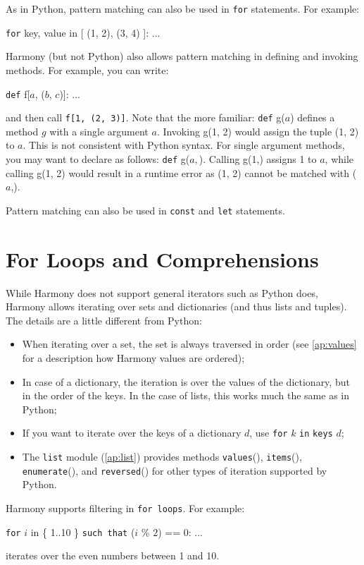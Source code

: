 \documentclass{report}
\newenvironment{code}{
\tcolorbox
}{
\endtcolorbox
}
\begin{document}
As in Python, pattern matching can also be used in \texttt{for} statements.
For example:
\begin{code}
\texttt{for} key, value in [ (1, 2), (3, 4) ]:
    ...
\end{code}

Harmony (but not Python)
also allows pattern matching in defining and invoking methods.
For example, you can write:
\begin{code}
\texttt{def} f[$a$, ($b$, $c$)]: ...
\end{code}
and then call \texttt{f[1, (2, 3)]}.
Note that the more familiar: \texttt{def} g($a$) defines a method $g$ with
a single argument $a$.  Invoking g(1, 2) would assign the tuple (1, 2) to
$a$.  This is not consistent with Python syntax.  For single argument methods,
you may want to declare as follows: \texttt{def} g($a,$).
Calling g(1,) assigns 1 to $a$, while calling g(1, 2) would result in a
runtime error as (1, 2) cannot be matched with ($a$,).

Pattern matching can also be used in \texttt{const} and \texttt{let}
statements.

\section{For Loops and Comprehensions}

While Harmony does not support general iterators such as Python does,
Harmony allows iterating over sets and dictionaries (and thus lists
and tuples).  The details are a little different from Python:

\begin{itemize}
\item When iterating over a set, the set is always traversed in order
(see \autoref{ap:values} for a description how Harmony values are ordered);
\item In case of a dictionary, the iteration is over the values of the
dictionary, but in the order of the keys.  In the case of lists, this
works much the same as in Python;
\item If you want to iterate over the keys of a dictionary $d$, use
\texttt{for} $k$ \texttt{in} \texttt{keys} $d$;
\item The \texttt{list} module (\autoref{ap:list}) provides methods \texttt{values}(),
\texttt{items}(), \texttt{enumerate}(), and \texttt{reversed}() for
other types of iteration supported by Python.
\end{itemize}

Harmony supports filtering in \texttt{for loops}.
For example:
\begin{code}
\texttt{for} $i$ in \{ 1..10 \} \texttt{such that} ($i$ \% 2) == 0: ...
\end{code}
\noindent iterates over the even numbers between 1 and 10.
\end{document}
